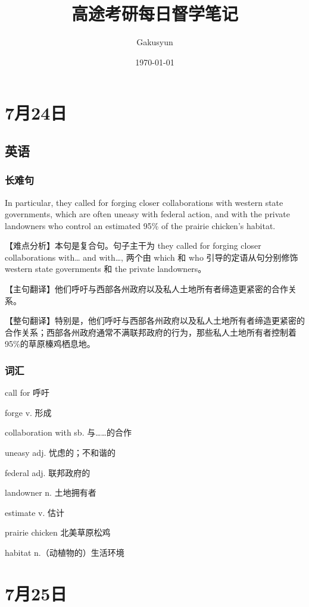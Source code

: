 \documentclass[UTF8]{ctexart}
\title{高途考研每日督学笔记}
\author{Gakusyun}
\date{\today}
\begin{document}
\maketitle
\thispagestyle{empty}
\newpage
\tableofcontents
\thispagestyle{empty}
\newpage
\setcounter{page}{1}
\section{7月24日}
\subsection{英语}
\subsubsection{长难句}
In particular, they called for forging closer collaborations with western state
governments, which are often uneasy with federal action, and with the private
landowners who control an estimated 95\% of the prairie chicken's habitat.

【难点分析】本句是复合句。句子主干为 they called for forging closer
collaborations with… and with…, 两个由 which 和 who 引导的定语从句分别修饰western state governments 和 the private landowners。

【主句翻译】他们呼吁与西部各州政府以及私人土地所有者缔造更紧密的合作关系。

【整句翻译】特别是，他们呼吁与西部各州政府以及私人土地所有者缔造更紧密的合作关系；西部各州政府通常不满联邦政府的行为，那些私人土地所有者控制着 95\%的草原榛鸡栖息地。
\subsubsection{词汇}
\begin{multicols}{2}
    call for 呼吁

    forge v. 形成

    collaboration with sb. 与……的合作

    uneasy adj. 忧虑的；不和谐的

    federal adj. 联邦政府的

    landowner n. 土地拥有者

    estimate v. 估计

    prairie chicken 北美草原松鸡

    habitat n.（动植物的）生活环境
\end{multicols}
\section{7月25日}
\end{document}
